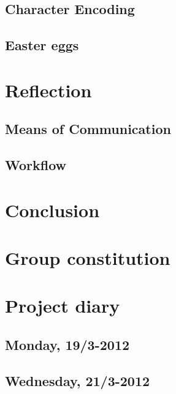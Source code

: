 \documentclass[a4paper,11pt]{article}
\begin{document}
\subsection{Character Encoding}


\subsection{Easter eggs}


\pagebreak
\section{Reflection}
\subsection{Means of Communication}


\subsection{Workflow}


\pagebreak
\section{Conclusion}
\label{sec:Conclusion}


\pagebreak
\appendix
\section{Group constitution}
\label{sec:Constitution}



\pagebreak
\section{Project diary}
\label{sec:Diary}

\subsection{Monday, 19/3-2012}


\pagebreak
\subsection{Wednesday, 21/3-2012}

\end{document}
